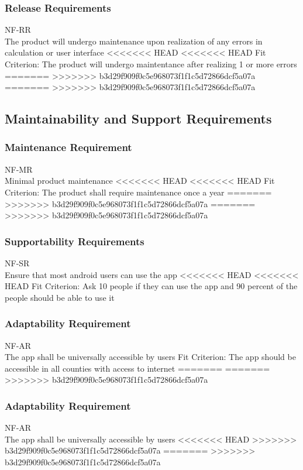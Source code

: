 \documentclass[12pt, titlepage]{article}
\begin{document}
\subsubsection{Release Requirements}
NF-RR \\
The product will undergo maintenance upon realization of any errors in calculation or user interface
<<<<<<< HEAD
<<<<<<< HEAD
{\color{red}Fit Criterion: The product will undergo maintentance after realizing 1 or more errors}
=======
>>>>>>> b3d29f909f0c5e968073f1f1c5d72866dcf5a07a
=======
>>>>>>> b3d29f909f0c5e968073f1f1c5d72866dcf5a07a




\subsection{Maintainability and Support Requirements}
\subsubsection{Maintenance Requirement}
NF-MR \\
Minimal product maintenance 
<<<<<<< HEAD
<<<<<<< HEAD
{\color{red}Fit Criterion: The product shall require maintenance once a year }
=======
>>>>>>> b3d29f909f0c5e968073f1f1c5d72866dcf5a07a
=======
>>>>>>> b3d29f909f0c5e968073f1f1c5d72866dcf5a07a

\subsubsection{Supportability Requirements}
NF-SR \\
Ensure that most  android users can use the app
<<<<<<< HEAD
<<<<<<< HEAD
{\color{red}Fit Criterion: Ask 10 people if they can use the app and 90 percent of the people should be able to use it }

\subsubsection{Adaptability Requirement}
NF-AR \\
The app shall be universally accessible by users
{\color{red}Fit Criterion: The app should be accessible in all counties with access to internet}
=======
=======
>>>>>>> b3d29f909f0c5e968073f1f1c5d72866dcf5a07a

\subsubsection{Adaptability Requirement}
NF-AR \\
The app shall be universally accessible by users 
<<<<<<< HEAD
>>>>>>> b3d29f909f0c5e968073f1f1c5d72866dcf5a07a
=======
>>>>>>> b3d29f909f0c5e968073f1f1c5d72866dcf5a07a
\end{document}

